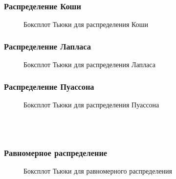 \documentclass{article}
\begin{document}
\subsubsection{Распределение Коши}
\begin{figure}[h]
\caption{Боксплот Тьюки для распределения Коши}
\end{figure}
\subsubsection{Распределение Лапласа}
\begin{figure}[h]
\caption{Боксплот Тьюки для распределения Лапласа}
\end{figure}
\subsubsection{Распределение Пуассона}
\begin{figure}[h]
\caption{Боксплот Тьюки для распределения Пуассона}
\end{figure}
\; \\ \; \\ \;
\subsubsection{Равномерное распределение}
\begin{figure}[h]
\caption{Боксплот Тьюки для равномерного распределения}
\end{figure}
\end{document}
